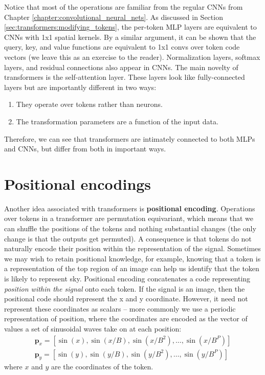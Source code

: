 Notice that most of the operations are familiar from the regular CNNs from Chapter \ref{chapter:convolutional_neural_nets}. As discussed in Section \ref{sec:transformers:modifying_tokens}, the per-token MLP layers are equivalent to CNNs with 1x1 spatial kernels. By a similar argument, it can be shown that the query, key, and value functions are equivalent to 1x1 convs over token code vectors (we leave this as an exercise to the reader). Normalization layers, softmax layers, and residual connections also appear in CNNs. The main novelty of transformers is the self-attention layer. These layers look like fully-connected layers but are importantly different in two ways:
\begin{enumerate}
    \item They operate over tokens rather than neurons.
    \item The transformation parameters are a function of the input data.
\end{enumerate}

Therefore, we can see that transformers are intimately connected to both MLPs and CNNs, but differ from both in important ways.

\section{Positional encodings}\label{sec:transformers:positional_encodings}
Another idea associated with transformers is {\bf positional encoding}. Operations over tokens in a transformer are permutation equivariant, which means that we can shuffle the positions of the tokens and nothing substantial changes (the only change is that the outputs get permuted). A consequence is that tokens do not naturally encode their position within the representation of the signal. Sometimes we may wish to retain positional knowledge, for example, knowing that a token is a representation of the top region of an image can help us identify that the token is likely to represent sky. Positional encoding concatenates a code representing \textit{position within the signal} onto each token. If the signal is an image, then the positional code should represent the x and y coordinate. However, it need not represent these coordinates as scalars -- more commonly we use a periodic representation of position, where the coordinates are encoded as the vector of values a set of sinusoidal waves take on at each position:
\begin{align}
    \mathbf{p}_x = [\sin(x), \sin(x/B), \sin(x/B^2), \ldots, \sin(x/B^P)]\\
    \mathbf{p}_y = [\sin(y), \sin(y/B), \sin(y/B^2), \ldots, \sin(y/B^P)]
\end{align}
where $x$ and $y$ are the coordinates of the token.

